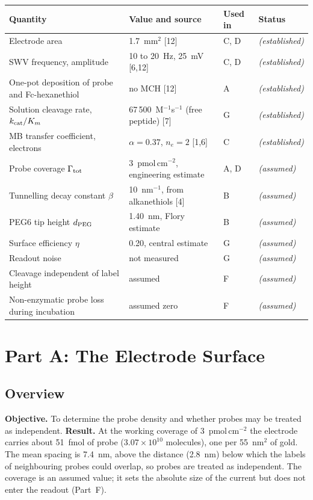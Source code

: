 \documentclass[10pt,a4paper]{article}
\numberwithin{equation}{section}
\newcommand{\cit}[1]{[#1]}
\newcommand{\Grtot}{\Gamma_{\rm tot}}
\newcommand{\FLAG}{\textit{(assumed)}}
\newcommand{\CONF}{\textit{(established)}}
\newcommand{\areaPerProbeNM}{55}
\newcommand{\dPEG}{1.40}
\newcommand{\gammaZero}{3}
\newcommand{\nProbes}{\ensuremath{3.07\times10^{10}}}
\newcommand{\nProbesFmol}{51}
\newcommand{\overlapSpacing}{2.8}
\newcommand{\spacingNM}{7.4}
\begin{document}
\begin{center}
\small\renewcommand{\arraystretch}{1.2}
\begin{tabular}{@{}p{5.2cm}p{5.5cm}p{1.5cm}l@{}}
\toprule
Quantity & Value and source & Used in & Status \\
\midrule
Electrode area & 1.7~mm$^2$ \cit{12} & C, D & \CONF \\
SWV frequency, amplitude & 10 to 20~Hz, 25~mV \cit{6,12} & C, D & \CONF \\
One-pot deposition of probe and Fc-hexanethiol & no MCH \cit{12} & A & \CONF \\
Solution cleavage rate, $k_{\rm cat}/K_m$ & 67\,500~M$^{-1}$s$^{-1}$ (free peptide) \cit{7} & G & \CONF \\
MB transfer coefficient, electrons & $\alpha=0.37$, $n_e=2$ \cit{1,6} & C & \CONF \\
Probe coverage $\Grtot$ & $3$~pmol\,cm$^{-2}$, engineering estimate & A, D & \FLAG \\
Tunnelling decay constant $\beta$ & 10~nm$^{-1}$, from alkanethiols \cit{4} & B & \FLAG \\
PEG6 tip height $d_{\rm PEG}$ & \dPEG~nm, Flory estimate & B & \FLAG \\
Surface efficiency $\eta$ & 0.20, central estimate & G & \FLAG \\
Readout noise & not measured & G & \FLAG \\
Cleavage independent of label height & assumed & F & \FLAG \\
Non-enzymatic probe loss during incubation & assumed zero & F & \FLAG \\
\bottomrule
\end{tabular}
\end{center}

\section{Part A: The Electrode Surface}
\label{sec:sam}

\subsection{Overview}

\textbf{Objective.} To determine the probe density and whether probes may be treated
as independent. \textbf{Result.} At the working coverage of
\gammaZero~pmol\,cm$^{-2}$ the electrode carries about \nProbesFmol~fmol of probe
(\nProbes{} molecules), one per \areaPerProbeNM~nm$^2$ of gold. The mean
spacing is \spacingNM~nm, above the distance (\overlapSpacing~nm) below which the labels of
neighbouring probes could overlap, so probes are treated as independent. The coverage is an
assumed value; it sets the absolute size of the current but does not enter the readout
(Part~F).
\end{document}
